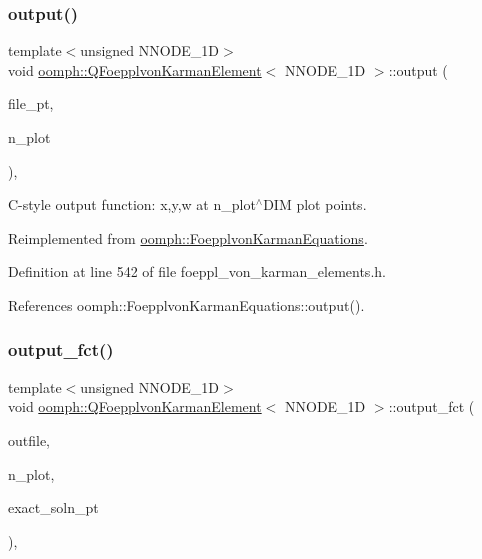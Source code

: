 \subsubsection{\texorpdfstring{output()}{output()}\hspace{0.1cm}{\footnotesize\ttfamily [4/4]}}
{\footnotesize\ttfamily template$<$unsigned N\+N\+O\+D\+E\+\_\+1D$>$ \\
void \hyperlink{classoomph_1_1QFoepplvonKarmanElement}{oomph\+::\+Q\+Foepplvon\+Karman\+Element}$<$ N\+N\+O\+D\+E\+\_\+1D $>$\+::output (\begin{DoxyParamCaption}\item[{F\+I\+LE $\ast$}]{file\+\_\+pt,  }\item[{const unsigned \&}]{n\+\_\+plot }\end{DoxyParamCaption})\hspace{0.3cm}{\ttfamily [inline]}, {\ttfamily [virtual]}}



C-\/style output function\+: x,y,w at n\+\_\+plot$^\wedge$\+D\+IM plot points. 



Reimplemented from \hyperlink{classoomph_1_1FoepplvonKarmanEquations_a9972ef429bbcf53c733c6798dd68271a}{oomph\+::\+Foepplvon\+Karman\+Equations}.



Definition at line 542 of file foeppl\+\_\+von\+\_\+karman\+\_\+elements.\+h.



References oomph\+::\+Foepplvon\+Karman\+Equations\+::output().

\mbox{\label{classoomph_1_1QFoepplvonKarmanElement_a8bfd0ab0a5a7726f154deec3bde0a22b}} 
\subsubsection{\texorpdfstring{output\+\_\+fct()}{output\_fct()}\hspace{0.1cm}{\footnotesize\ttfamily [1/2]}}
{\footnotesize\ttfamily template$<$unsigned N\+N\+O\+D\+E\+\_\+1D$>$ \\
void \hyperlink{classoomph_1_1QFoepplvonKarmanElement}{oomph\+::\+Q\+Foepplvon\+Karman\+Element}$<$ N\+N\+O\+D\+E\+\_\+1D $>$\+::output\+\_\+fct (\begin{DoxyParamCaption}\item[{std\+::ostream \&}]{outfile,  }\item[{const unsigned \&}]{n\+\_\+plot,  }\item[{\hyperlink{classoomph_1_1FiniteElement_a690fd33af26cc3e84f39bba6d5a85202}{Finite\+Element\+::\+Steady\+Exact\+Solution\+Fct\+Pt}}]{exact\+\_\+soln\+\_\+pt }\end{DoxyParamCaption})\hspace{0.3cm}{\ttfamily [inline]}, {\ttfamily [virtual]}}



